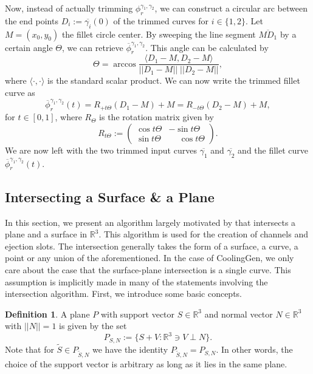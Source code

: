 \documentclass[a4paper, 11pt]{report}
\theoremstyle{definition}
\newtheorem{definition}{Definition}[section]
\begin{document}
	Now, instead of actually trimming $\phi^{\gamma_1, \gamma_2}_r$, we can construct a circular arc between the end points $D_i := \overline{\gamma_i}(0)$ of the trimmed curves for $i \in \{1,2\}$. Let $M = (x_0, y_0)$ the fillet circle center. By sweeping the line segment $\overline{M D_1}$ by a certain angle $\Theta$, we can retrieve $\overline{\phi}^{\gamma_1, \gamma_2}_r$. This angle can be calculated by
		$$ \Theta = \arccos \frac{\langle D_1-M, D_2-M \rangle}{||D_1-M|| \; ||D_2-M||}, $$
	where $\langle \cdot, \cdot \rangle$ is the standard scalar product. We can now write the trimmed fillet curve as
		$$ \overline{\phi}^{\gamma_1, \gamma_2}_r(t) = R_{+t\Theta}(D_1-M)+M = R_{-t\Theta}(D_2-M)+M,$$
	for $t \in [0,1]$, where $R_{\Theta}$ is the rotation matrix given by
		\begin{equation}
			R_{t\Theta} :=
			\begin{pmatrix}
				\cos t\Theta & -\sin t\Theta \\
				\sin t\Theta & \phantom{+}\cos t\Theta
			\end{pmatrix}.
			\label{eq:rotationmat}
		\end{equation}
	We are now left with the two trimmed input curves $\overline{\gamma_1}$ and $\overline{\gamma_2}$ and the fillet curve $\overline{\phi}^{\gamma_1, \gamma_2}_r(t)$.

\subsection{Intersecting a Surface \& a Plane}\label{sec:surfaceplaneintersection}
	In this section, we present an algorithm largely motivated by \cite{Barnhill1990} that intersects a plane and a surface in $\mathbb{R}^3$. This algorithm is used for the creation of channels and ejection slots. The intersection generally takes the form of a surface, a curve, a point or any union of the aforementioned. In the case of CoolingGen, we only care about the case that the surface-plane intersection is a single curve. This assumption is implicitly made in many of the statements involving the intersection algorithm. First, we introduce some basic concepts.

	\begin{definition}
		A plane $P$ with support vector $S \in \mathbb{R}^3$ and normal vector $N \in \mathbb{R}^3$ with $||N|| = 1$ is given by the set
			$$ P_{S,N} := \{S+V : \mathbb{R}^3 \ni V \perp N\}. $$
		Note that for $\tilde S \in P_{\tilde S, N}$ we have the identity $P_{\tilde S, N} = P_{S, N}$. In other words, the choice of the support vector is arbitrary as long as it lies in the same plane.
	\end{definition}
\end{document}
